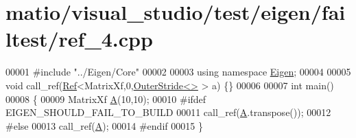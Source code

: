 \hypertarget{matio_2visual__studio_2test_2eigen_2failtest_2ref__4_8cpp_source}{}\section{matio/visual\+\_\+studio/test/eigen/failtest/ref\+\_\+4.cpp}
\label{matio_2visual__studio_2test_2eigen_2failtest_2ref__4_8cpp_source}

\begin{DoxyCode}
00001 \textcolor{preprocessor}{#include "../Eigen/Core"}
00002 
00003 \textcolor{keyword}{using namespace }\hyperlink{namespace_eigen}{Eigen};
00004 
00005 \textcolor{keywordtype}{void} call\_ref(\hyperlink{group___core___module_class_eigen_1_1_ref}{Ref}<MatrixXf,0,\hyperlink{class_eigen_1_1_outer_stride}{OuterStride<>} > a) \{\}
00006 
00007 \textcolor{keywordtype}{int} main()
00008 \{
00009   MatrixXf \hyperlink{group___core___module_class_eigen_1_1_matrix}{A}(10,10);
00010 \textcolor{preprocessor}{#ifdef EIGEN\_SHOULD\_FAIL\_TO\_BUILD}
00011   call\_ref(\hyperlink{group___core___module_class_eigen_1_1_matrix}{A}.transpose());
00012 \textcolor{preprocessor}{#else}
00013   call\_ref(\hyperlink{group___core___module_class_eigen_1_1_matrix}{A});
00014 \textcolor{preprocessor}{#endif}
00015 \}
\end{DoxyCode}
